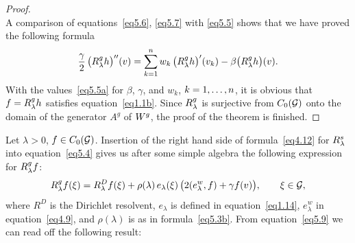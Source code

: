 \documentclass[11pt,a4paper]{amsart}
\newcommand{\gb}{\beta}
\renewcommand{\gg}{\gamma}
\newcommand{\gl}{\lambda}
\newcommand{\cG}{\mathcal{G}}
\newcommand{\1}{1}
\theoremstyle{remark}
\newcommand{\Co}{\ensuremath C_0(\cG)}
\newcommand{\kn}{\ensuremath k=1,\dotsc,n}
\newcommand{\RsW}{\ensuremath R^s}
\newcommand{\Wg}{\ensuremath W^g}
\newcommand{\Rg}{\ensuremath R^g}
\numberwithin{equation}{section}
\begin{document}
\begin{proof}
\begin{equation}
\end{equation}
A comparison of equations~\eqref{eq5.6}, \eqref{eq5.7} with \eqref{eq5.5} shows
that we have proved the following formula
\begin{equation}    \label{eq5.8}
    \frac{\gg}{2}\,\bigl(\Rg_\gl h\bigr)''(v)
        = \sum_{k=1}^n w_k\,\bigl(\Rg_\gl h\bigr)'(v_k) - \gb \bigl(\Rg_\gl h\bigr)(v).
\end{equation}
With the values~\eqref{eq5.5a} for $\gb$, $\gg$, and $w_k$, $\kn$, it is obvious that
$f=\Rg_\gl h$ satisfies equation~\eqref{eq1.1b}. Since $\Rg_\gl$ is surjective from
$\Co$ onto the domain of the generator $A^g$ of $\Wg$, the proof of the theorem is finished.
\end{proof}

Let $\gl>0$, $f\in\Co$. Insertion of the right hand side of formula~\eqref{eq4.12}
for $\RsW_\gl$ into equation~\eqref{eq5.4} gives us after some simple algebra the
following expression for $\Rg_\gl f$:
\begin{equation}    \label{eq5.9}
    \Rg_\gl f(\xi)
        = R^D_\gl f(\xi) + \rho(\gl)\,e_\gl(\xi)\,\bigl(2(e_\gl^w,f) + \gg f(v)\bigr),
            \qquad \xi\in\cG,
\end{equation}
where $R^D$ is the Dirichlet resolvent, $e_\gl$ is defined in equation~\eqref{eq1.14},
$e^w_\gl$ in equation~\eqref{eq4.9}, and $\rho(\gl)$ is as in formula~\eqref{eq5.3b}.
From equation~\eqref{eq5.9} we can read off the following result:
\end{document}
